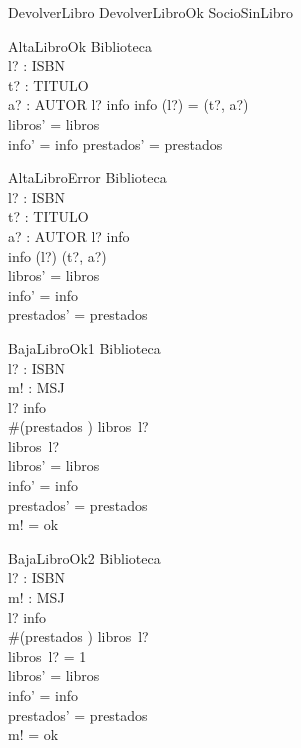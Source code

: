 \documentclass{article}
\begin{document}
\begin{zed}
    DevolverLibro  DevolverLibroOk \lor SocioSinLibro
\end{zed}

\begin{schema}{AltaLibroOk}
\Delta Biblioteca \\
l? : ISBN \\ 
t? : TITULO \\
a? : AUTOR 
\where
l? \in \dom info \implies info (l?) = (t?, a?) \\
libros' = libros \oplus {} \\ %
info' = info \oplus {}
prestados' = prestados
\end{schema}

\begin{schema}{AltaLibroError}
\Xi Biblioteca \\
l? : ISBN \\ 
t? : TITULO \\
a? : AUTOR 
\where
l? \in \dom info \\
info (l?) \neq (t?, a?) \\
libros' = libros \\
info' = info \\
prestados' = prestados
\end{schema}

\begin{schema}{BajaLibroOk1}
\Delta Biblioteca \\
l? : ISBN \\
m! : MSJ \\
\where
l? \in \dom info \\
\#(prestados \rres {}) \lt libros~l? \\
libros~l?  \\
libros' = libros \oplus {} \\ %
info' = info \\
prestados' = prestados \\
m! = ok \\
\end{schema}

\begin{schema}{BajaLibroOk2}
\Delta Biblioteca \\
l? : ISBN \\
m! : MSJ \\
\where
l? \in \dom info \\
\#(prestados \rres {}) \lt libros~l? \\
libros~l? = 1 \\
libros' = libros \dares {} \\
info' = info \dares {} \\
prestados' = prestados \\
m! = ok \\
\end{schema}
\end{document}
